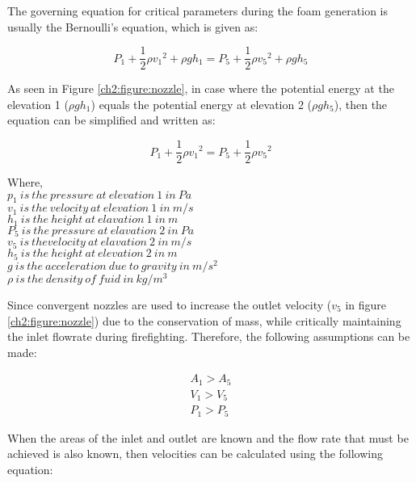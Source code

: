 The governing equation for critical parameters during the foam generation is usually the Bernoulli's equation, which is given as:

\begin{equation}
    P_1+\frac{1}{2}\rho{v_1}^2 + \rho gh_1 = P_5+\frac{1}{2}\rho{v_5}^2 + \rho gh_5
\end{equation}

As seen in Figure \ref{ch2:figure:nozzle}, in case where the potential energy at the elevation 1 ($\rho gh_1$) equals the potential energy at elevation 2 ($\rho gh_5$), then the equation can be simplified and written as:

\begin{equation}
    P_1+\frac{1}{2}\rho{v_1}^2 = P_5+\frac{1}{2}\rho{v_5}^2
\end{equation}

\begin{doublespace}
    Where, \\
    $p_1\ is\ the\ pressure\ at\ elevation\ 1\ in\ Pa$ \\
    $v_1\ is\ the\ velocity\ at\ elevation\ 1\ in\ m/s$ \\
    $h_1\ is\ the\ height\ at\ elavation\ 1\ in\ m$ \\
    $P_5\ is\ the\ pressure\ at\ elavation\ 2\ in\ Pa$ \\
    $v_5\ is\ the velocity\ at\ elavation\ 2\ in\ m/s$ \\
    $h_5\ is\ the\ height\ at\ elevation\ 2\ in\ m$ \\
    $g\ is\ the\ acceleration\ due\ to\ gravity\ in\ m/s^2$ \\
    $\rho\ is\ the\ density\ of\ fuid\ in\ kg/m^3$ \\
\end{doublespace}
\vspace{-1em}

Since convergent nozzles are used to increase the outlet velocity ($v_5$  in figure \ref{ch2:figure:nozzle}) due to the conservation of mass, while critically maintaining the inlet flowrate during firefighting. Therefore, the following assumptions can be made:

\vspace{-2em}
\begin{gather*}
    A_1 > A_5 \\
    V_1 > V_5 \\
    P_1 > P_5
\end{gather*}

When the areas of the inlet and outlet are known and the flow rate that must be achieved is also known, then velocities can be calculated using the following equation:

